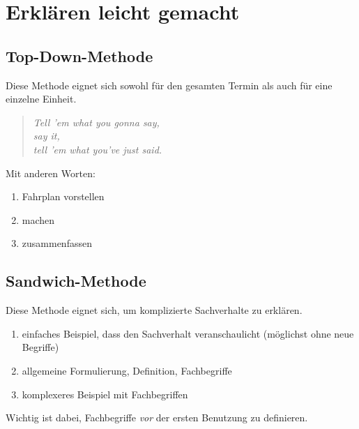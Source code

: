 \section{Erklären leicht gemacht}

\subsection{Top-Down-Methode}
Diese Methode eignet sich sowohl für den gesamten Termin als auch für eine einzelne Einheit.

\begin{quote}
  \emph{Tell 'em what you gonna say,\\
  say it,\\
  tell 'em what you've just said.}
\end{quote} 

Mit anderen Worten:
\begin{enumerate}
  \item Fahrplan vorstellen
  \item machen
  \item zusammenfassen
\end{enumerate}

\subsection{Sandwich-Methode}
Diese Methode eignet sich, um komplizierte Sachverhalte zu erklären.

\begin{enumerate}
  \item einfaches Beispiel, dass den Sachverhalt veranschaulicht (möglichst ohne neue Begriffe)
  \item allgemeine Formulierung, Definition, Fachbegriffe
  \item komplexeres Beispiel mit Fachbegriffen
\end{enumerate}

Wichtig ist dabei, Fachbegriffe \emph{vor} der ersten Benutzung zu definieren.
